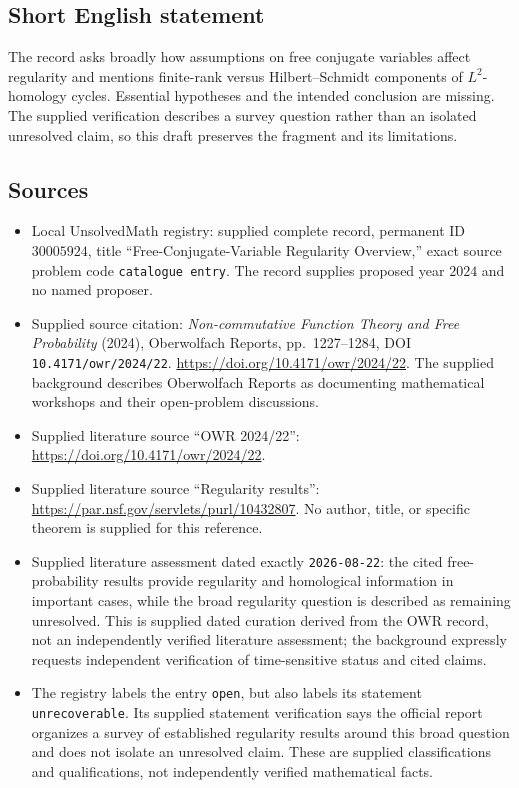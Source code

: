 \documentclass[11pt]{article}
\begin{document}
\subsection{Short English statement}
The record asks broadly how assumptions on free conjugate variables affect regularity and mentions finite-rank versus Hilbert--Schmidt components of \(L^2\)-homology cycles. Essential hypotheses and the intended conclusion are missing. The supplied verification describes a survey question rather than an isolated unresolved claim, so this draft preserves the fragment and its limitations.
\subsection{Sources}
\begin{itemize}
\item Local UnsolvedMath registry: supplied complete record, permanent ID \(30005924\), title ``Free-Conjugate-Variable Regularity Overview,'' exact source problem code \texttt{catalogue entry}. The record supplies proposed year \(2024\) and no named proposer.
\item Supplied source citation: \emph{Non-commutative Function Theory and Free Probability} (2024), Oberwolfach Reports, pp.\ 1227--1284, DOI \texttt{10.4171/owr/2024/22}. \url{https://doi.org/10.4171/owr/2024/22}. The supplied background describes Oberwolfach Reports as documenting mathematical workshops and their open-problem discussions.
\item Supplied literature source ``OWR 2024/22'': \url{https://doi.org/10.4171/owr/2024/22}.
\item Supplied literature source ``Regularity results'': \url{https://par.nsf.gov/servlets/purl/10432807}. No author, title, or specific theorem is supplied for this reference.
\item Supplied literature assessment dated exactly \texttt{2026-08-22}: the cited free-probability results provide regularity and homological information in important cases, while the broad regularity question is described as remaining unresolved. This is supplied dated curation derived from the OWR record, not an independently verified literature assessment; the background expressly requests independent verification of time-sensitive status and cited claims.
\item The registry labels the entry \texttt{open}, but also labels its statement \texttt{unrecoverable}. Its supplied statement verification says the official report organizes a survey of established regularity results around this broad question and does not isolate an unresolved claim. These are supplied classifications and qualifications, not independently verified mathematical facts.
\end{itemize}
\end{document}
